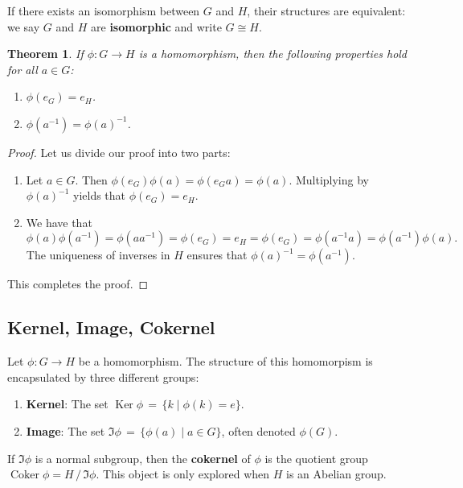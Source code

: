 \documentclass[11pt]{article}
\newtheorem{theorem}{Theorem}
\newcommand{\Ker}{\operatorname{Ker}}
\newcommand{\Coker}{\operatorname{Coker}}
\begin{document}
If there exists an isomorphism between $G$ and $H$, their structures are equivalent: we say $G$ and $H$ are \textbf{isomorphic} and write $G \cong H$.

\begin{adjustwidth}{0.5cm}{}
  \begin{theorem}
    If $\phi : G \to H$ is a homomorphism, then the following properties hold for all $a \in G$:
    \begin{enumerate}
      \item $\phi(e_{G}) = e_{H}$.
      \item $\phi(a^{-1}) = \phi(a)^{-1}$.
    \end{enumerate}
  \end{theorem}
  \begin{proof}
    Let us divide our proof into two parts:
    \begin{enumerate}
      \item Let $a \in G$. Then $\phi(e_{G}) \phi(a) = \phi(e_{G}a) = \phi(a)$. Multiplying by $\phi(a)^{-1}$ yields that $\phi(e_{G}) = e_{H}$.
      \item We have that
        \[
          \phi(a) \phi(a^{-1}) = \phi(a a^{-1}) = \phi(e_{G}) = e_{H} = \phi(e_{G}) = \phi(a^{-1}a) = \phi(a^{-1}) \phi(a).
        \]
      The uniqueness of inverses in $H$ ensures that $\phi(a)^{-1} = \phi(a^{-1})$.
    \end{enumerate}
    This completes the proof.
  \end{proof}
\end{adjustwidth}

\newpage


\subsection{Kernel, Image, Cokernel}

Let $\phi : G \to H$ be a homomorphism. The structure of this homomorpism is encapsulated by three different groups:

\begin{enumerate}
  \item \textbf{Kernel}: The set $\Ker \phi \, = \, \{ k \mid \phi(k) = e \}$.
  \item \textbf{Image}: The set $\Im \phi \, = \, \{ \phi(a) \mid a \in G \}$, often denoted $\phi(G)$.
\end{enumerate}

If $\Im \phi$ is a normal subgroup, then the \textbf{cokernel} of $\phi$ is the quotient group $\Coker \phi = H \, / \, \Im \phi$. This object is only explored when $H$ is an Abelian group.
\end{document}

